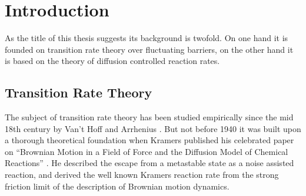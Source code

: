 \setcounter{page}{1}
\chapter{Introduction}
\label{intro}

As the title of this thesis suggests its background is twofold. On one hand it is founded on transition rate theory over fluctuating barriers, on the other hand it is based on the theory of diffusion controlled reaction rates. 
\vspace{-.3 cm}
\section{Transition Rate Theory} 

The subject of transition rate theory has been studied empirically since the mid 18th century by Van't Hoff \cite{hoff1884} and Arrhenius \cite{arrhenius1889}. But not before 1940 it was built upon a thorough theoretical foundation when Kramers published his celebrated paper on ``Brownian Motion in a Field of Force and the Diffusion Model of Chemical Reactions'' \cite{Kramers1940}.  He described the escape from a metastable state as a noise assisted reaction, and derived the well known Kramers reaction rate from the strong friction limit of the description of Brownian motion dynamics.
